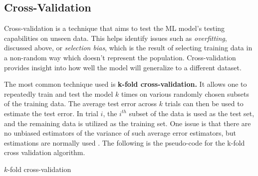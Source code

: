 \documentclass[nobib]{tufte-handout} %
\begin{document}
  \subsection{Cross-Validation}%
  \label{sub:Cross-Validation}
Cross-validation is a technique that aims to test the ML model's testing capabilities on unseen data. This helps identify issues such as \textit{overfitting}, discussed above, or \textit{selection bias}, which is the result of selecting training data in a non-random way which doesn't represent the population. Cross-validation provides insight into how well the model will generalize to a different dataset.

The most common technique used is \textbf{k-fold cross-validation.} It allows one to repeatedly train and test the model $k$ times on various randomly chosen subsets of the training data. The average test error across $k$ trials can then be used to estimate the test error. In trial $i$, the $i^{th}$ subset of the data is used as the test set, and the remaining data is utilized as the training set. One issue is that there are no unbiased estimators of the variance of such average error estimators, but estimations are normally used \citep{Goodfellow-et-al-2016}. The following is the pseudo-code for the k-fold cross validation algorithm.


\begin{algorithm}[h!]
  \caption{$k$-fold cross-validation}\label{k-CrossVal} 
\end{algorithm}
\end{document}
